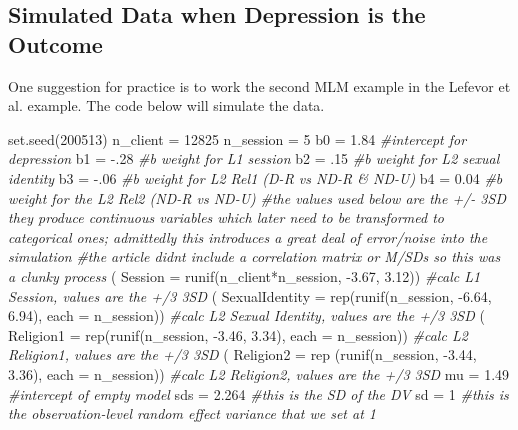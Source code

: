 \documentclass[
  11pt,
]{book}
\newenvironment{Shaded}{\begin{snugshade}}{\end{snugshade}}
\newcommand{\AttributeTok}[1]{\textcolor[rgb]{0.77,0.63,0.00}{#1}}
\newcommand{\CommentTok}[1]{\textcolor[rgb]{0.56,0.35,0.01}{\textit{#1}}}
\newcommand{\DecValTok}[1]{\textcolor[rgb]{0.00,0.00,0.81}{#1}}
\newcommand{\FloatTok}[1]{\textcolor[rgb]{0.00,0.00,0.81}{#1}}
\newcommand{\FunctionTok}[1]{\textcolor[rgb]{0.00,0.00,0.00}{#1}}
\newcommand{\NormalTok}[1]{#1}
\newcommand{\OtherTok}[1]{\textcolor[rgb]{0.56,0.35,0.01}{#1}}
\newcommand{\SpecialCharTok}[1]{\textcolor[rgb]{0.00,0.00,0.00}{#1}}
\begin{document}
\hypertarget{simulated-data-when-depression-is-the-outcome}{%
\subsection{Simulated Data when Depression is the Outcome}\label{simulated-data-when-depression-is-the-outcome}}

One suggestion for practice is to work the second MLM example in the Lefevor et al. \citep{lefevor_religious_2017} example. The code below will simulate the data.

\begin{Shaded}
\begin{Highlighting}[]
\FunctionTok{set.seed}\NormalTok{(}\DecValTok{200513}\NormalTok{)}
\NormalTok{n\_client }\OtherTok{=} \DecValTok{12825}
\NormalTok{n\_session }\OtherTok{=} \DecValTok{5}
\NormalTok{b0 }\OtherTok{=} \FloatTok{1.84} \CommentTok{\#intercept for depression}
\NormalTok{b1 }\OtherTok{=} \SpecialCharTok{{-}}\NormalTok{.}\DecValTok{28} \CommentTok{\#b weight for L1 session}
\NormalTok{b2 }\OtherTok{=}\NormalTok{ .}\DecValTok{15} \CommentTok{\#b weight for L2 sexual identity}
\NormalTok{b3 }\OtherTok{=}  \SpecialCharTok{{-}}\NormalTok{.}\DecValTok{06} \CommentTok{\#b weight for L2 Rel1 (D{-}R vs ND{-}R \& ND{-}U)}
\NormalTok{b4 }\OtherTok{=} \FloatTok{0.04} \CommentTok{\#b weight for the L2 Rel2 (ND{-}R vs ND{-}U)}
\CommentTok{\#the values used below are the +/{-} 3SD they produce continuous variables which later need to be transformed to categorical ones; admittedly this introduces a great deal of error/noise into the simulation}
\CommentTok{\#the article didn\textquotesingle{}t include a correlation matrix or M/SDs so this was a clunky process }
\NormalTok{( }\AttributeTok{Session =} \FunctionTok{runif}\NormalTok{(n\_client}\SpecialCharTok{*}\NormalTok{n\_session, }\SpecialCharTok{{-}}\FloatTok{3.67}\NormalTok{, }\FloatTok{3.12}\NormalTok{)) }\CommentTok{\#calc L1 Session, values are the +/3 3SD}
\NormalTok{( }\AttributeTok{SexualIdentity =} \FunctionTok{rep}\NormalTok{(}\FunctionTok{runif}\NormalTok{(n\_session, }\SpecialCharTok{{-}}\FloatTok{6.64}\NormalTok{, }\FloatTok{6.94}\NormalTok{), }\AttributeTok{each =}\NormalTok{ n\_session)) }\CommentTok{\#calc L2 Sexual Identity, values are the +/3 3SD}
\NormalTok{( }\AttributeTok{Religion1 =} \FunctionTok{rep}\NormalTok{(}\FunctionTok{runif}\NormalTok{(n\_session, }\SpecialCharTok{{-}}\FloatTok{3.46}\NormalTok{, }\FloatTok{3.34}\NormalTok{), }\AttributeTok{each =}\NormalTok{ n\_session)) }\CommentTok{\#calc L2 Religion1, values are the +/3 3SD}
\NormalTok{( }\AttributeTok{Religion2 =} \FunctionTok{rep}\NormalTok{ (}\FunctionTok{runif}\NormalTok{(n\_session, }\SpecialCharTok{{-}}\FloatTok{3.44}\NormalTok{, }\FloatTok{3.36}\NormalTok{), }\AttributeTok{each =}\NormalTok{ n\_session)) }\CommentTok{\#calc L2 Religion2, values are the +/3 3SD}
\NormalTok{mu }\OtherTok{=} \FloatTok{1.49} \CommentTok{\#intercept of empty model }
\NormalTok{sds }\OtherTok{=} \FloatTok{2.264} \CommentTok{\#this is the SD of the DV}
\NormalTok{sd }\OtherTok{=} \DecValTok{1} \CommentTok{\#this is the observation{-}level random effect variance that we set at 1}


\end{Highlighting}
\end{Shaded}
\end{document}
